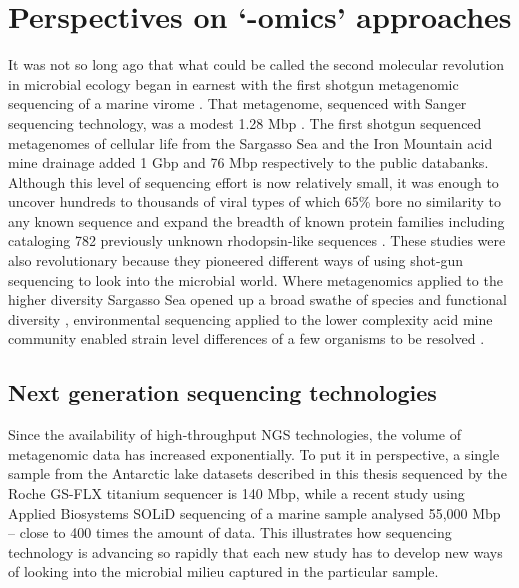 \section{Perspectives on `-omics' approaches }
It was not so long ago that what could be called the second molecular revolution in microbial ecology began in earnest with the first shotgun metagenomic sequencing of a marine virome \cite{Breitbart2002}.
That metagenome, sequenced with Sanger sequencing technology, was a modest 1.28 Mbp \cite{Breitbart2002}.
The first shotgun sequenced metagenomes of cellular life from the Sargasso Sea \cite{Venter2004} and the Iron Mountain acid mine drainage \cite{Tyson2004} added 1 Gbp and 76 Mbp respectively to the public databanks.
Although this level of sequencing effort is now relatively small, it was enough to uncover hundreds to thousands of viral types of which 65\% bore no similarity to any known sequence \cite{Breitbart2002} and expand the breadth of known protein families including cataloging 782 previously unknown rhodopsin-like sequences \cite{Venter2004}.  
These studies were also revolutionary because they pioneered different ways of using shot-gun sequencing to look into the microbial world.
Where metagenomics applied to the higher diversity Sargasso Sea opened up a broad swathe of species and functional diversity \cite{Venter2004}, environmental sequencing applied to the lower complexity acid mine community enabled strain level differences of a few organisms to be resolved \cite{Tyson2004}.

\subsection{Next generation sequencing technologies}
Since the availability of high-throughput \ac{NGS} technologies, the volume of metagenomic data has increased exponentially.
To put it in perspective, a single sample from the Antarctic lake datasets described in this thesis sequenced by the Roche GS-FLX titanium sequencer is 140 Mbp, while a recent study using Applied Biosystems SOLiD sequencing of a marine sample \cite{Iverson2012} analysed 55,000 Mbp -- close to 400 times the amount of data.
This illustrates how sequencing technology is advancing so rapidly that each new study has to develop new ways of looking into the microbial milieu captured in the particular sample.

